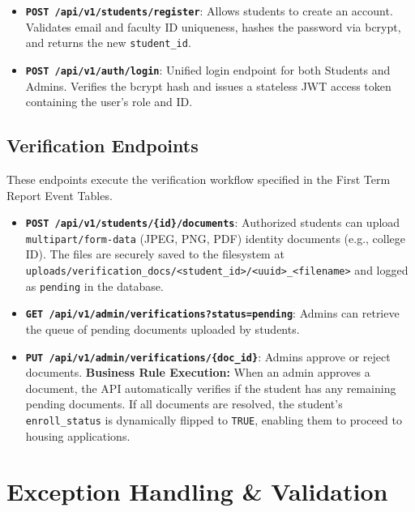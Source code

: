 \documentclass[12pt,a4paper]{article}
\begin{document}
\begin{itemize}[noitemsep]
    \item \textbf{\texttt{POST /api/v1/students/register}}: Allows students to create an account. Validates email and faculty ID uniqueness, hashes the password via bcrypt, and returns the new \texttt{student\_id}.
    \item \textbf{\texttt{POST /api/v1/auth/login}}: Unified login endpoint for both Students and Admins. Verifies the bcrypt hash and issues a stateless JWT access token containing the user's role and ID.
\end{itemize}

\subsection{Verification Endpoints}

These endpoints execute the verification workflow specified in the First Term Report Event Tables.

\begin{itemize}[noitemsep]
    \item \textbf{\texttt{POST /api/v1/students/\{id\}/documents}}: Authorized students can upload \texttt{multipart/form-data} (JPEG, PNG, PDF) identity documents (e.g., college ID). The files are securely saved to the filesystem at \texttt{uploads/verification\_docs/<student\_id>/<uuid>\_<filename>} and logged as \texttt{pending} in the database.
    
    \item \textbf{\texttt{GET /api/v1/admin/verifications?status=pending}}: Admins can retrieve the queue of pending documents uploaded by students.
    
    \item \textbf{\texttt{PUT /api/v1/admin/verifications/\{doc\_id\}}}: Admins approve or reject documents. 
    \textbf{Business Rule Execution:} When an admin approves a document, the API automatically verifies if the student has any remaining pending documents. If all documents are resolved, the student's \texttt{enroll\_status} is dynamically flipped to \texttt{TRUE}, enabling them to proceed to housing applications.
\end{itemize}

\section{Exception Handling \& Validation}
\end{document}
